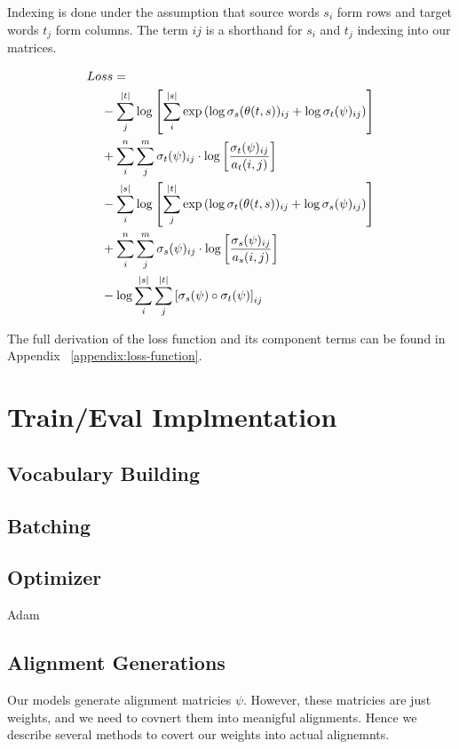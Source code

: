 \documentclass[twoside,twocolumn]{article}
\begin{document}
Indexing is done under the assumption that source words $s_i$ form rows
and target words $t_j$ form columns. The term $ij$ is a shorthand
for $s_i$ and $t_j$ indexing into our matrices.

\begin{equation}
  \centering
\begin{split}
  Lo&ss = \\
  &- \sum_j^{|t|} \log \left[
      \sum_i^{|s|} \exp \left(
        \log \sigma_s(\theta(t, s))_{ij} + \log \sigma_t(\psi)_{ij} \right)
    \right] \\
  &+ \sum_i^n \sum_j^m \sigma_t(\psi)_{ij} \cdot \log \left[
    \frac{\sigma_t(\psi)_{ij}}{a_t(i, j)} \right] \\
  &- \sum_i^{|s|} \log \left[ \sum_j^{|t|}
      \exp \left(
        \log \sigma_t(\theta(t, s))_{ij} + \log \sigma_s(\psi)_{ij}
      \right)
    \right] \\
  &+ \sum_i^n \sum_j^m \sigma_s(\psi)_{ij} \cdot \log \left[
    \frac{\sigma_s(\psi)_{ij}}{a_s(i, j)} \right] \\
  &- \log \sum_i^{|s|} \sum_j^{|t|} \left[
    \sigma_s(\psi) \circ \sigma_t(\psi) \right]_{ij} \\
\end{split}
\end{equation}

The full derivation of the loss function and its component terms
can be found in Appendix ~\ref{appendix:loss-function}.


\section{Train/Eval Implmentation}
\subsection{Vocabulary Building}
\subsection{Batching}
\subsection{Optimizer}
Adam
\subsection{Alignment Generations}
Our models generate alignment matricies $\psi$. However, these matricies
are just weights, and we need to covnert them into meanigful alignments.
Hence we describe several methods to covert our weights into actual alignemnts.
\end{document}

